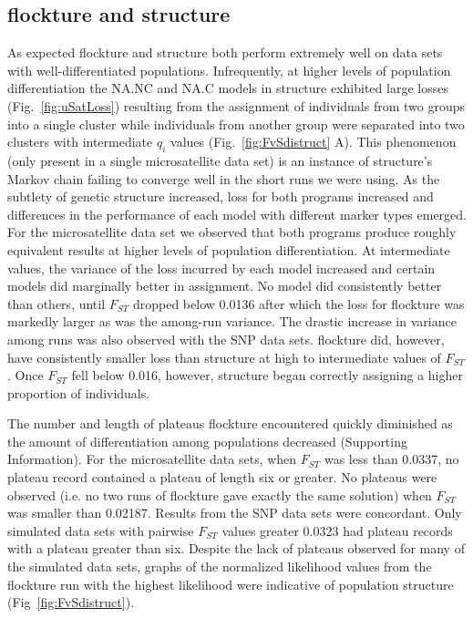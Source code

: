 \subsection*{{\sc flockture} and {\sc structure}} 
As expected {\sc flockture} and {\sc structure} both perform extremely well on data sets with
well-differentiated populations. Infrequently, at higher levels of population differentiation the 
NA.NC and NA.C models in {\sc structure} exhibited large losses (Fig.~\ref{fig:uSatLoss})
resulting from the assignment of individuals from two groups into a single cluster while 
individuals from another group were separated into two clusters
with intermediate $q_i$ values (Fig.~\ref{fig:FvSdistruct} A). This phenomenon 
(only present in a single microsatellite data set) is an instance of {\sc structure}'s
Markov chain failing to converge well in the short runs we were using. As the subtlety of genetic structure 
increased, loss for both programs increased and differences in the performance of
each model with different marker types emerged.
For the microsatellite data set we observed that both programs
produce roughly equivalent results at higher levels of population differentiation. At intermediate 
values, the variance of the loss incurred by each model increased and certain models did marginally
better in assignment. No model did consistently better than others, until $F_{ST}$ dropped 
below 0.0136 after which the loss for {\sc flockture} was markedly larger as was the among-run
variance. The drastic increase in variance among runs was also observed with the SNP data sets. 
{\sc flockture} did, however, have consistently smaller loss than  {\sc structure} at high to intermediate 
values of $F_{ST}$. Once $F_{ST}$ fell below 0.016, however, {\sc structure} began correctly assigning a 
higher proportion of individuals. 

The number and length of plateaus {\sc flockture} encountered quickly %
diminished as the amount of differentiation among populations decreased (Supporting Information). For the microsatellite data sets,
when $F_{ST}$ was less than 0.0337, no plateau record
contained a plateau of length six or greater. No plateaus were observed 
(i.e. no two runs of {\sc flockture} gave exactly the same solution) when 
$F_{ST}$ was smaller than 0.02187. Results from the SNP data sets
were concordant.
Only simulated data sets with pairwise $F_{ST}$ values greater 0.0323 had plateau records with a 
plateau greater than six. Despite the lack of plateaus observed for many of the simulated data sets, 
graphs of the normalized likelihood values from the {\sc flockture} run with the highest 
likelihood were indicative of population structure (Fig~\ref{fig:FvSdistruct}).  

